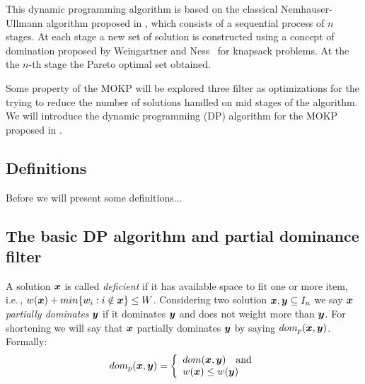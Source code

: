 

This dynamic programming algorithm is based on the classical Nemhauser-Ullmann algorithm proposed
in \cite{nemhauser1969discrete}, which consists of a sequential process of $n$ stages.
At each stage a new set of solution is constructed using a concept of domination
proposed by Weingartner and Ness~\cite{weingartner1967methods} for knapsack problems.
At the the $n$-th stage the Pareto optimal set obtained.

Some property of the MOKP will be explored
three filter as optimizations for the trying
to reduce the number of solutions
handled on mid stages of the algorithm.
We will introduce the dynamic programming (DP) algorithm for the MOKP proposed in \cite{bazgan2009}.

\subsection{Definitions}
Before we will present some definitions...

\subsection{The basic DP algorithm and partial dominance filter}

A solution $\boldsymbol{x}$ is called \emph{deficient} if it has available space
to fit one or more item, i.e.\,, $w(\boldsymbol{x}) + min\{ w_i : i \notin \boldsymbol{x} \} \leq W$.
Considering two solution $\boldsymbol{x}, \boldsymbol{y} \subseteq I_n$ we say
$\boldsymbol{x}$ \emph{partially dominates} $\boldsymbol{y}$ if it dominates $\boldsymbol{y}$ and
does not weight more than $\boldsymbol{y}$.
For shortening we will say that $\boldsymbol{x}$ partially dominates $\boldsymbol{y}$ by saying $dom_p(\boldsymbol{x}, \boldsymbol{y})$.
Formally:
\begin{displaymath}
    dom_p(\boldsymbol{x}, \boldsymbol{y}) = \left\{
      \begin{array}{l}
          dom(\boldsymbol{x}, \boldsymbol{y}) \quad \text{and}\\
          w(\boldsymbol{x}) \leq w(\boldsymbol{y})
  \end{array} \right.
\end{displaymath}

